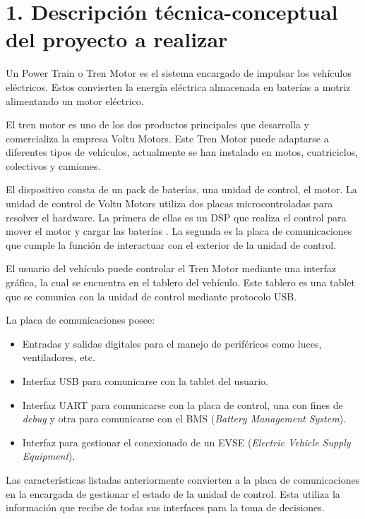 \documentclass[
11pt, %
codirector, %
]{charter}
\begin{document}
\section{1. Descripción técnica-conceptual del proyecto a realizar}
\label{sec:descripcion}


Un Power Train o Tren Motor es el sistema encargado de impulsar los vehículos eléctricos. Estos convierten la energía eléctrica almacenada en baterías a motriz alimentando un motor eléctrico.

El tren motor es uno de los dos productos principales que desarrolla y comercializa la empresa Voltu Motors. Este Tren Motor puede adaptarse a diferentes tipos de vehículos, actualmente se han instalado en motos, cuatriciclos, colectivos y camiones.

El dispositivo consta de un pack de baterías, una unidad de control, el motor. La unidad de control de Voltu Motors utiliza dos placas microcontroladas para resolver el hardware.
La primera de ellas es un DSP que realiza el control para mover el motor y cargar las baterías . La segunda es la placa de comunicaciones que cumple la función de interactuar con el exterior de la unidad de control.

El usuario del vehículo puede controlar el Tren Motor mediante una interfaz gráfica, la cual se encuentra en el tablero del vehículo. Este tablero es una tablet que se comunica con la unidad de control mediante protocolo USB.

La placa de comunicaciones posee:

\begin{itemize}
	\item Entradas y salidas digitales para el manejo de periféricos como luces, ventiladores, etc.
	\item Interfaz USB para comunicarse con la tablet del usuario.
	\item Interfaz UART para comunicarse con la placa de control, una con fines de \textit{debug} y otra para comunicarse con el BMS (\textit{Battery Management System}).
	\item Interfaz para gestionar el conexionado de un EVSE (\textit{Electric Vehicle Supply Equipment}).
\end{itemize}

Las características listadas anteriormente convierten a la placa de comunicaciones en la encargada de gestionar el estado de la unidad de control. Esta utiliza la información que recibe de todas sus interfaces para la toma de decisiones.
\end{document}
